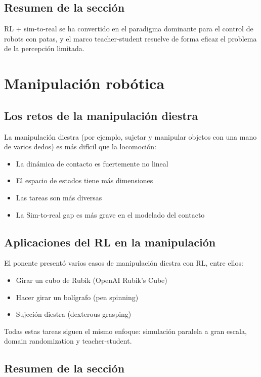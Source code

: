 \documentclass[a4paper]{article}
\begin{document}
\subsection{Resumen de la sección}

RL + sim-to-real se ha convertido en el paradigma dominante para el control de robots con patas, y el marco teacher-student resuelve de forma eficaz el problema de la percepción limitada.
\section{Manipulación robótica}

\subsection{Los retos de la manipulación diestra}

La manipulación diestra (por ejemplo, sujetar y manipular objetos con una mano de varios dedos) es más difícil que la locomoción:
\begin{itemize}
    \item La dinámica de contacto es fuertemente no lineal
    \item El espacio de estados tiene más dimensiones
    \item Las tareas son más diversas
    \item La Sim-to-real gap es más grave en el modelado del contacto
\end{itemize}

\subsection{Aplicaciones del RL en la manipulación}

El ponente presentó varios casos de manipulación diestra con RL, entre ellos:
\begin{itemize}
    \item Girar un cubo de Rubik (OpenAI Rubik's Cube)
    \item Hacer girar un bolígrafo (pen spinning)
    \item Sujeción diestra (dexterous grasping)
\end{itemize}

Todas estas tareas siguen el mismo enfoque: simulación paralela a gran escala, domain randomization y teacher-student.

\subsection{Resumen de la sección}
\end{document}
